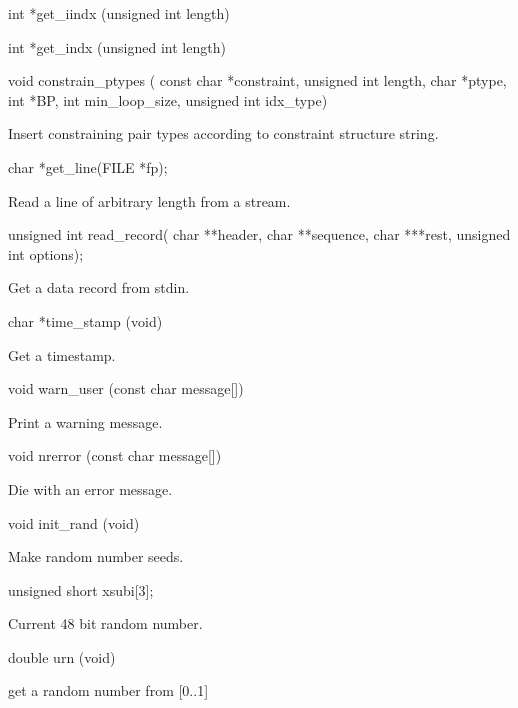 \begin{DoxyVerb}int   *get_iindx (unsigned int length)
\end{DoxyVerb}


\begin{DoxyVerb}int   *get_indx (unsigned int length)
\end{DoxyVerb}


\begin{DoxyVerb}void constrain_ptypes (
                const char *constraint,
                unsigned int length,
                char *ptype,
                int *BP,
                int min_loop_size,
                unsigned int idx_type)
\end{DoxyVerb}
 Insert constraining pair types according to constraint structure string.

\begin{DoxyVerb}char  *get_line(FILE *fp);
\end{DoxyVerb}
 Read a line of arbitrary length from a stream.

\begin{DoxyVerb}unsigned int read_record(
                char **header,
                char **sequence,
                char ***rest,
                unsigned int options);
\end{DoxyVerb}
 Get a data record from stdin.

\begin{DoxyVerb}char  *time_stamp (void)
\end{DoxyVerb}
 Get a timestamp.

\begin{DoxyVerb}void warn_user (const char message[])
\end{DoxyVerb}
 Print a warning message.

\begin{DoxyVerb}void nrerror (const char message[])
\end{DoxyVerb}
 Die with an error message.

\begin{DoxyVerb}void   init_rand (void)
\end{DoxyVerb}
 Make random number seeds.

\begin{DoxyVerb}unsigned short xsubi[3];
\end{DoxyVerb}
 Current 48 bit random number.

\begin{DoxyVerb}double urn (void)
\end{DoxyVerb}
 get a random number from \mbox{[}0..1\mbox{]}

